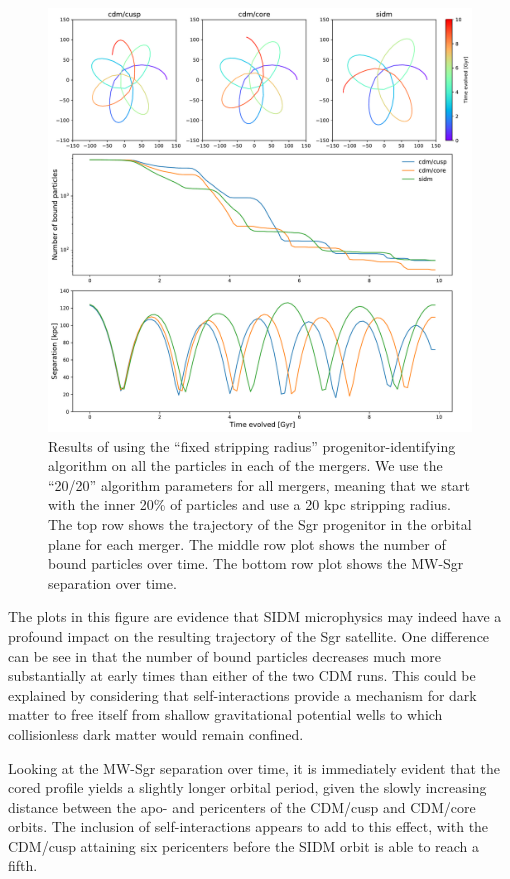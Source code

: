 \begin{figure}
    \centering
    \includegraphics[width=0.9\linewidth]{figs/all_mergers_pretty.pdf}
    \caption{%
        Results of using the ``fixed stripping radius'' progenitor-identifying
        algorithm on all the particles in each of the mergers. We use the
        ``20/20'' algorithm parameters for all mergers, meaning that we start
        with the inner 20\% of particles and use a 20 kpc stripping radius. The
        top row shows the trajectory of the Sgr progenitor in the orbital plane
        for each merger. The middle row plot shows the number of bound particles
        over time. The bottom row plot shows the MW-Sgr separation over time.
    }
    \label{fig:all}
\end{figure}

The plots in this figure are evidence that SIDM microphysics may indeed have a
profound impact on the resulting trajectory of the Sgr satellite.  One
difference can be see in that the number of bound particles decreases much
more substantially at early times than either of the two CDM runs.  This could
be explained by considering that self-interactions provide a mechanism for
dark matter to free itself from shallow gravitational potential wells to which
collisionless dark matter would remain confined.

Looking at the MW-Sgr separation over time, it is immediately evident that the
cored profile yields a slightly longer orbital period, given the slowly
increasing distance between the apo- and pericenters of the CDM/cusp and
CDM/core orbits.  The inclusion of self-interactions appears to add to this
effect, with the CDM/cusp attaining six pericenters before the SIDM orbit is
able to reach a fifth.

